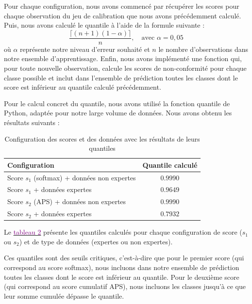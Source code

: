 \documentclass[a4paper,12pt]{article}
\begin{document}
Pour chaque configuration, nous avons commencé par récupérer les scores pour chaque observation du jeu de calibration que nous avons précédemment calculé. Puis, nous avons calculé le quantile à l'aide de la formule suivante : $$\frac{\lceil(n+1)(1 - \alpha)\rceil}{n}, \quad \text{avec } \alpha = 0,05$$ où $\alpha$ représente notre niveau d'erreur souhaité et $n$ le nombre d'observations dans notre ensemble d'apprentissage. Enfin, nous avons implémenté une fonction qui, pour toute nouvelle observation, calcule les scores de non-conformité pour chaque classe possible et inclut dans l'ensemble de prédiction toutes les classes dont le score est inférieur au quantile calculé précédemment.

\vspace{0.2cm}

Pour le calcul concret du quantile, nous avons utilisé la fonction quantile de Python, adaptée pour notre large volume de données. Nous avons obtenu les résultats suivants : 

\begin{table}[H]
\centering
    \begin{tabular}{|l|c|}
        \hline
        \textbf{Configuration} & \textbf{Quantile calculé} \\
        \hline
        Score $s_1$ (softmax) + données non expertes & $0.9990$ \\
        Score $s_1$ + données expertes & $0.9649$ \\
        Score $s_2$ (APS) + données non expertes & $0.9990$ \\
        Score $s_2$ + données expertes & $0.7932$ \\
        \hline
        \end{tabular}
    \caption{Configuration des scores et des données avec les résultats de leurs quantiles}
    \label{tab: scores et quantiles}
\end{table}

Le \hyperref[tab: scores et quantiles]{\textcolor{purple}{tableau 2}} présente les quantiles calculés pour chaque configuration de score ($s_1$ ou $s_2$) et de type de données (expertes ou non expertes).

\vspace{0.2cm}

Ces quantiles sont des seuils critiques, c'est-à-dire que pour le premier score (qui correspond au score softmax), nous incluons dans notre ensemble de prédiction toutes les classes dont le score est inférieur au quantile. Pour le deuxième score (qui correspond au score cumulatif APS), nous incluons les classes jusqu'à ce que leur somme cumulée dépasse le quantile.
\end{document}
